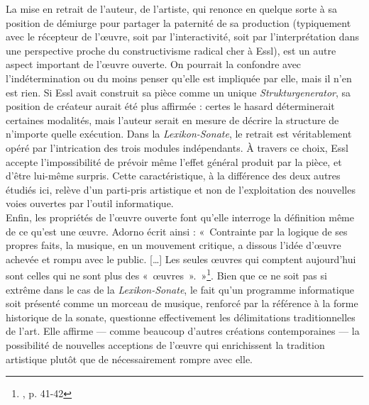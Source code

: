 \documentclass[a4paper,12pt]{article}
\newcommand{\guill}[1]{«~#1~»}
\begin{document}
La mise en retrait de l'auteur, de l'artiste, qui renonce en quelque sorte à sa position de démiurge pour partager la paternité de sa production (typiquement avec le récepteur de l'œuvre, soit par l'interactivité, soit par l'interprétation dans une perspective proche du constructivisme radical cher à Essl), est un autre aspect important de l'œuvre ouverte. On pourrait la confondre avec l'indétermination ou du moins penser qu'elle est impliquée par elle, mais il n'en est rien. Si Essl avait construit sa pièce comme un unique \emph{Strukturgenerator}, sa position de créateur aurait été plus affirmée : certes le hasard déterminerait certaines modalités, mais l'auteur serait en mesure de décrire la structure de n'importe quelle exécution. Dans la \emph{Lexikon-Sonate}, le retrait est véritablement opéré par l'intrication des trois modules indépendants. À travers ce choix, Essl accepte l'impossibilité de prévoir même l'effet général produit par la pièce, et d'être lui-même surpris. Cette caractéristique, à la différence des deux autres étudiés ici, relève d'un parti-pris artistique et non de l'exploitation des nouvelles voies ouvertes par l'outil informatique. \\
Enfin, les propriétés de l'œuvre ouverte font qu'elle interroge la définition même de ce qu'est une œuvre. Adorno écrit ainsi : \guill{Contrainte par la logique de ses propres faits, la musique, en un mouvement critique, a dissous l'idée d'œuvre achevée et rompu avec le public. [\dots] Les seules œuvres qui comptent aujourd'hui sont celles qui ne sont plus des \guill{œuvres}.}\footnote{\cite{adorno1949philosophie}, p. 41-42}. Bien que ce ne soit pas si extrême dans le cas de la \emph{Lexikon-Sonate}, le fait qu'un programme informatique soit présenté comme un morceau de musique, renforcé par la référence à la forme historique de la sonate, questionne effectivement les délimitations traditionnelles de l'art. Elle affirme --- comme beaucoup d'autres créations contemporaines --- la possibilité de nouvelles acceptions de l'œuvre qui enrichissent la tradition artistique plutôt que de nécessairement rompre avec elle. \\
\end{document}
